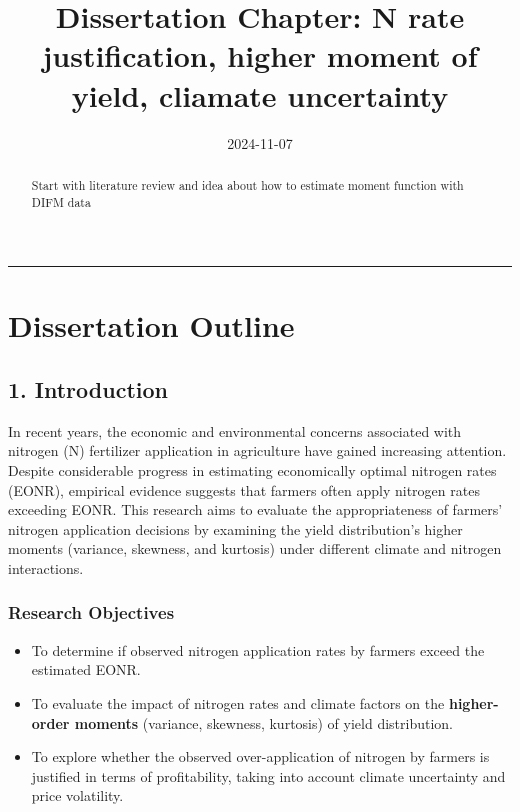 \documentclass[
]{article}
\title{Dissertation Chapter: N rate justification, higher moment of
yield, cliamate uncertainty}
\date{2024-11-07}
\providecommand{\tightlist}{%
  \setlength{\itemsep}{0pt}\setlength{\parskip}{0pt}}\usepackage{longtable,booktabs,array}
\begin{document}
\maketitle
\begin{abstract}
Start with literature review and idea about how to estimate moment
function with DIFM data
\end{abstract}


\begin{center}\rule{0.5\linewidth}{0.5pt}\end{center}

\section{Dissertation Outline}\label{dissertation-outline}

\subsection{1. Introduction}\label{introduction}

In recent years, the economic and environmental concerns associated with
nitrogen (N) fertilizer application in agriculture have gained
increasing attention. Despite considerable progress in estimating
economically optimal nitrogen rates (EONR), empirical evidence suggests
that farmers often apply nitrogen rates exceeding EONR. This research
aims to evaluate the appropriateness of farmers' nitrogen application
decisions by examining the yield distribution's higher moments
(variance, skewness, and kurtosis) under different climate and nitrogen
interactions.

\subsubsection{Research Objectives}\label{research-objectives}

\begin{itemize}
\tightlist
\item
  To determine if observed nitrogen application rates by farmers exceed
  the estimated EONR.
\item
  To evaluate the impact of nitrogen rates and climate factors on the
  \textbf{higher-order moments} (variance, skewness, kurtosis) of yield
  distribution.
\item
  To explore whether the observed over-application of nitrogen by
  farmers is justified in terms of profitability, taking into account
  climate uncertainty and price volatility.
\end{itemize}
\end{document}

